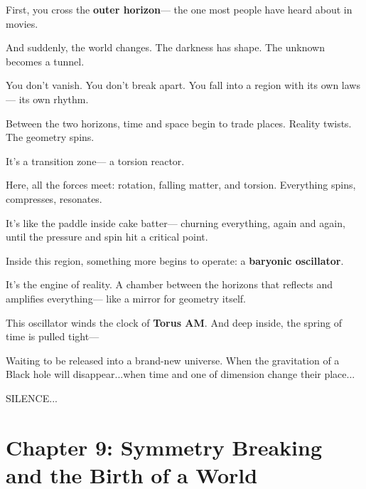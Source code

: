 \documentclass{article}
\begin{document}
\vspace{1ex}
\noindent
First, you cross the \textbf{outer horizon}—  
the one most people have heard about in movies.

\vspace{1ex}
\noindent
And suddenly, the world changes.  
The darkness has shape.  
The unknown becomes a tunnel.

\vspace{1ex}
\noindent
You don’t vanish.  
You don’t break apart.  
You fall into a region with its own laws—  
its own rhythm.

\vspace{1ex}
\noindent
Between the two horizons, time and space begin to trade places.  
Reality twists.  
The geometry spins.

\vspace{1ex}
\noindent
It’s a transition zone—  
a torsion reactor.

\vspace{1ex}
\noindent
Here, all the forces meet:  
rotation, falling matter, and torsion.  
Everything spins, compresses, resonates.

\vspace{1ex}
\noindent
It’s like the paddle inside cake batter—  
churning everything, again and again,  
until the pressure and spin hit a critical point.

\vspace{1ex}
\noindent
Inside this region, something more begins to operate:  
a \textbf{baryonic oscillator}.

\vspace{1ex}
\noindent
It’s the engine of reality.  
A chamber between the horizons that reflects and amplifies everything—  
like a mirror for geometry itself.

\vspace{1ex}
\noindent
This oscillator winds the clock of \textbf{Torus AM}.  
And deep inside, the spring of time is pulled tight—

\vspace{1ex}
\noindent
Waiting to be released  
into a brand-new universe. When the gravitation of a Black hole will disappear...when time and one of dimension change their place...
 \vspace{lex}
 \noindent

 SILENCE...



\section*{Chapter 9: Symmetry Breaking and the Birth of a World}
\end{document}
